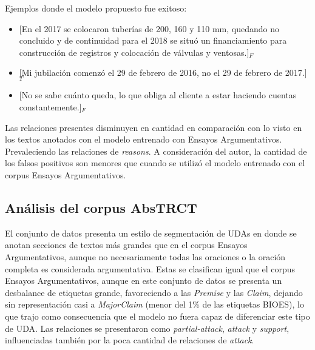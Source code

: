 \documentclass[a4paper,11pt,twocolumn,twoside]{article}
\begin{document}
Ejemplos donde el modelo propuesto fue exitoso:
\begin{itemize}
	\item \text{} [En el 2017 se colocaron tuberías de 200, 160 y 110 mm, quedando no concluido y de
		      continuidad para el 2018 se situó un financiamiento para construcción de registros y colocación de 
		      válvulas y ventosas.]$_F$ %
	\item \text{} [Mi jubilación comenzó el 29 de febrero de 2016, no el 29 de febrero de 2017.]$_T$ %
	\item \text{} [No se sabe cuánto queda, lo que obliga al cliente a estar haciendo cuentas constantemente.]$_F$ %
\end{itemize}

Las relaciones presentes disminuyen en cantidad en comparación con lo visto en los textos anotados con el modelo 
entrenado con Ensayos Argumentativos. Prevaleciendo las relaciones de \textit{reasons}. A consideración del autor,
la cantidad de los falsos positivos son menores que cuando se utilizó el modelo entrenado con el corpus Ensayos Argumentativos.

\subsection{Análisis del corpus AbsTRCT}


El conjunto de datos presenta un estilo de segmentación de UDAs en donde se anotan 
secciones de textos más grandes que en el corpus Ensayos Argumentativos, aunque no necesariamente 
todas las oraciones o la oración completa es considerada argumentativa. 
Estas se clasifican igual que el corpus Ensayos Argumentativos, aunque 
en este conjunto de datos se presenta un desbalance de etiquetas grande, favoreciendo 
a las \textit{Premise} y las \textit{Claim}, dejando sin representación casi a \textit{MajorClaim}
(menor del 1\% de las etiquetas BIOES), lo que trajo como consecuencia que el modelo no fuera 
capaz de diferenciar este tipo de UDA. Las relaciones se presentaron como \textit{partial-attack},
\textit{attack} y \textit{support}, influenciadas también por la poca cantidad de relaciones de \textit{attack}.
\end{document}
